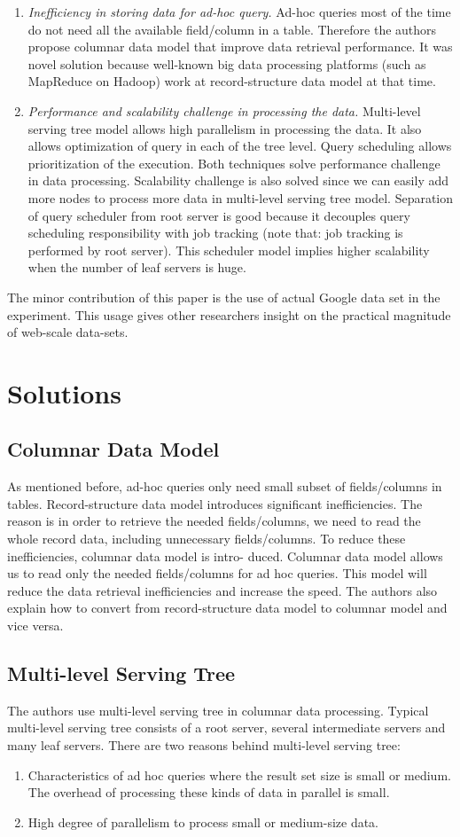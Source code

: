 \documentclass[twocolumn]{article}
\newcommand{\be}{\begin{enumerate}}
\newcommand{\ee}{\end{enumerate}}
\newcommand{\ii}{\item}
\begin{document}
\be
\ii \textit{Inefficiency in storing data for ad-hoc query.}
Ad-hoc queries most of the time do not need all the available field/column in a table. Therefore the authors propose columnar data model that improve data retrieval performance. It was novel solution because well-known big data processing platforms (such as MapReduce on Hadoop) work at record-structure data model at that time.
\ii \textit{Performance and scalability challenge in processing the data.}
Multi-level serving tree model allows high parallelism in processing the data. It also allows optimization of query in each of the tree level. Query scheduling allows prioritization of the execution. Both techniques solve performance challenge in data processing.
Scalability challenge is also solved since we can easily add more nodes to process more data in multi-level serving tree model. Separation of query scheduler from root server is good because it decouples query scheduling responsibility with job tracking (note that: job tracking is performed by root server). This scheduler model implies higher scalability when the number of leaf servers is huge.
\ee
The minor contribution of this paper is the use of actual Google data set in the experiment. 
This usage gives other researchers insight on the practical magnitude of web-scale data-sets.


\section{Solutions}
\subsection{Columnar Data Model}
As mentioned before, ad-hoc queries only need small subset of fields/columns in tables. Record-structure data model introduces significant inefficiencies. The reason is in order to retrieve the needed fields/columns, we need to read the whole record data, including unnecessary fields/columns. To reduce these inefficiencies, columnar data model is intro- duced. Columnar data model allows us to read only the needed fields/columns for ad hoc queries. This model will reduce the data retrieval inefficiencies and increase the speed. The authors also explain how to convert from record-structure data model to columnar model and vice versa.

\subsection{Multi-level Serving Tree}
The authors use multi-level serving tree in columnar data processing. Typical multi-level serving tree consists of a root server, several intermediate servers and many leaf servers. There are two reasons behind multi-level serving tree:
\be
\ii Characteristics of ad hoc queries where the result set size is small or medium. The overhead of processing these kinds of data in parallel is small.
\ii High degree of parallelism to process small or medium-size data.
\ee
\end{document}
